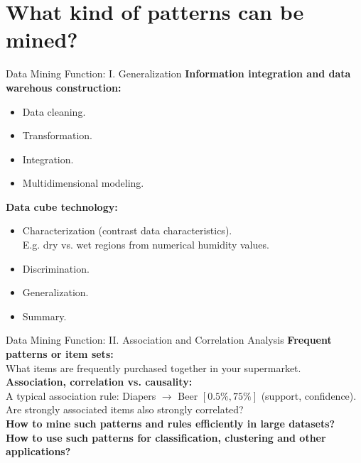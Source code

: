 \section{What kind of patterns can be mined?}

\begin{frame}{Data Mining Function: I. Generalization}
	\textbf{Information integration and data warehous construction:}
	\begin{itemize}
		\item Data cleaning.
		\item Transformation.
		\item Integration.
		\item Multidimensional modeling.
	\end{itemize}
	\textbf{Data cube technology:}
	\begin{itemize}
		\item Characterization (contrast data characteristics).\\
		E.g. dry vs. wet regions from numerical humidity values.
		\item Discrimination.
		\item Generalization.
		\item Summary.
	\end{itemize}
\end{frame}

\begin{frame}{Data Mining Function: II. Association and Correlation Analysis}
	\textbf{Frequent patterns or item sets:}\\
	What items are frequently purchased together in your supermarket.\\[0.5cm]
	
	\textbf{Association, correlation vs. causality:}\\
	A typical association rule: Diapers $\rightarrow$ Beer $[0.5\%,75\%]$ 
	(support, confidence).\\
	Are strongly associated items also strongly correlated?\\[0.5cm]
	
	\textbf{How to mine such patterns and rules efficiently in large 
	datasets?}\\
	\textbf{How to use such patterns for classification, clustering and other 
	applications?}
\end{frame}

